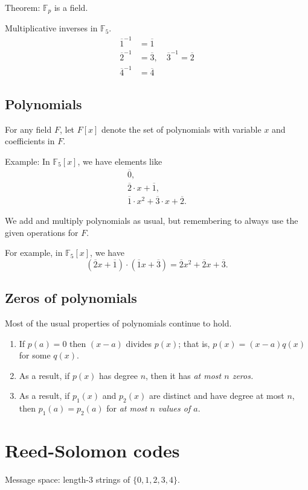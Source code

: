 \documentclass[11pt]{article}
\begin{document}
Theorem: \(\mathbb F_p\) is a field.


Multiplicative inverses in \(\mathbb F_5\).
   \begin{align*}
\overline{1}^{-1} &= \overline 1 \\
\overline{2}^{-1} &= \overline 3, \quad \overline{3}^{-1} = \overline 2 \\
\overline{4}^{-1} &= \overline 4
   \end{align*}

\subsection*{Polynomials}
\label{sec:orgb5f03d1}
For any field \(F\), let \(F[x]\) denote the set of polynomials with variable \(x\) and coefficients in \(F\).

Example: In \(\mathbb F_5[x]\), we have elements like
\begin{align*}
 \overline 0,\\
 \overline 2 \cdot x + \overline 1, \\
 \overline 1 \cdot x^2 + \overline 3 \cdot x + \overline 2.
\end{align*}

We add and multiply polynomials as usual, but remembering to always use the given operations for \(F\).

For example, in \(\mathbb F_5[x]\), we have
\[
   (\overline 2 x+ \overline 1) \cdot (\overline 1 x+ \overline 3) = \overline 2 x^2 + \overline 2 x + \overline 3.
   \]

\subsection*{Zeros of polynomials}
\label{sec:org0a4d66b}
Most of the usual properties of polynomials continue to hold.

\begin{enumerate}
\item If \(p(a) = 0\) then \((x-a)\) divides \(p(x)\); that is, \(p(x) = (x-a) q(x)\) for some \(q(x)\).
\item As a result, if \(p(x)\) has degree \(n\), then it has \emph{at most \(n\) zeros.}
\item As a result, if \(p_1(x)\) and \(p_2(x)\) are distinct and have degree at most \(n\), then \(p_1(a) = p_2(a)\) for \emph{at most \(n\) values of \(a\)}.
\end{enumerate}

\section*{Reed-Solomon codes}
\label{sec:org89cfede}
Message space: length-3 strings of \(\{0,1,2,3,4\}\).
\end{document}
